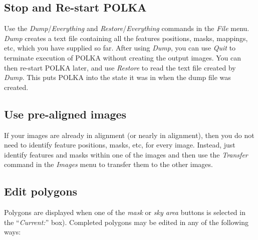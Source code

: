 \documentclass[11pt]{article}
\newcommand{\htmlref}[2]{#1}
\newcommand{\xlabel}[1]{}
\newcommand{\mylabel}[1] {\xlabel{#1}\label{#1}}
\begin{document}
\subsection {\mylabel{POLKA_STOP_START}Stop and Re-start POLKA}
Use the \htmlref{\emph{Dump}}{POLKA_DUMP}/\emph{Everything} and
\htmlref{\emph{Restore}}{POLKA_RESTORE}/\emph{Everything} commands in the
\htmlref{\emph{File}}{POLKA_FILE_MENU} menu. \emph{Dump} creates a text file
containing all the features positions, masks, mappings, etc, which you
have supplied so far. After using \emph{Dump}, you can use \htmlref{{\em
Quit}}{POLKA_QUIT} to terminate execution of POLKA without creating the
output images. You can then re-start POLKA later, and use \emph{Restore}
to read the text file created by \emph{Dump}. This puts POLKA into the
state it was in when the dump file was created.

\subsection {\mylabel{POLKA_PREALIGNED_IMAGES}Use pre-aligned images}
If your images are already in alignment (or nearly in alignment), then
you do not need to identify feature positions, masks, etc, for every image.
Instead, just identify features and masks within one of the images and then
use the \emph{Transfer} command in the \htmlref{\emph{Images}}{POLKA_IMAGES_MENU}
menu to transfer them to the other images.

\subsection {\mylabel{POLKA_EDITING_POLYGONS}Edit polygons}
Polygons are displayed when one of the \emph{mask} or \emph{sky
area} buttons is selected in the ``\htmlref{\emph{Current:}}{POLKA_CURRENT}''
box). Completed polygons may be edited in any of the following ways:
\end{document}
